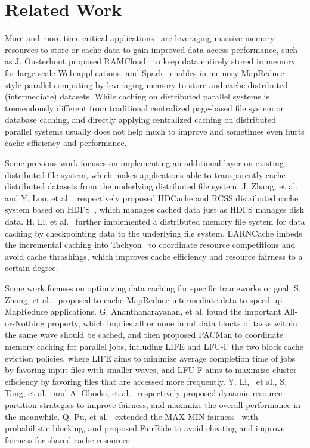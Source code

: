 \section{Related Work}\label{sec:RelatedWork}

More and more time-critical applications~\cite{redis,memcached} are leveraging massive memory resources to store or cache data to gain improved data access performance, such as J. Ousterhout proposed RAMCloud~\cite{ramcloud} to keep data entirely stored in memory for large-scale Web applications, and Spark~\cite{spark,rdd} enables in-memory MapReduce~\cite{mapreduce}-style parallel computing by leveraging memory to store and cache distributed (intermediate) datasets. While caching on distributed parallel systems is tremendously different from traditional centralized page-based file system or database caching, and directly applying centralized caching on distributed parallel systems usually does not help much to improve and sometimes even hurts cache efficiency and performance.

Some previous work focuses on implementing an additional layer on existing distributed file system, which makes applications able to transparently cache distributed datasets from the underlying distributed file system. J. Zhang, et al.~\cite{dist-cache-hdfs} and Y. Luo, et al.~\cite{rcss} respectively proposed HDCache and RCSS distributed cache system based on HDFS~\cite{hdfs1,hdfs2}, which manages cached data just as HDFS manages disk data. H. Li, et al.~\cite{tachyon} further implemented a distributed memory file system for data caching by checkpointing data to the underlying file system. EARNCache imbeds the incremental caching into Tachyon~\cite{tachyon} to coordinate resource competitions and avoid cache thrashings, which improves cache efficiency and resource fairness to a certain degree.

Some work focuses on optimizing data caching for specific frameworks or goal. S. Zhang, et al.~\cite{mapreduce-cache} proposed to cache MapReduce intermediate data to speed up MapReduce applications. G. Ananthanarayanan, et al.\cite{pacman} found the important All-or-Nothing property, which implies all or none input data blocks of tasks within the same wave should be cached, and then proposed PACMan to coordinate memory caching for parallel jobs, including LIFE and LFU-F the two block cache eviction policies, where LIFE aims to minimize average completion time of jobs by favoring input files with smaller waves, and LFU-F aims to maximize cluster efficiency by favoring files that are accessed more frequently. Y. Li, ~et al.\cite{rate-aware}, S. Tang, et al.~\cite{ltrf} and A. Ghodsi, et al.~\cite{drf} respectively proposed dynamic resource partition strategies to improve fairness, and maximize the overall performance in the meanwhile. Q. Pu, et al.~\cite{fairride} extended the MAX-MIN fairness~\cite{maxmin,maxmin2} with probabilistic blocking, and proposed FairRide to avoid cheating and improve fairness for shared cache resources.

